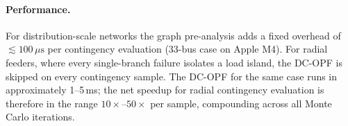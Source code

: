 \paragraph{Performance.}

For distribution-scale networks the graph pre-analysis adds a fixed overhead
of $\lesssim 100\,\mu\mathrm{s}$ per contingency evaluation (33-bus case on
Apple M4).  For radial feeders, where every single-branch failure isolates a
load island, the DC-OPF is skipped on every contingency sample.  The DC-OPF
for the same case runs in approximately 1--5\,ms; the net speedup for radial
contingency evaluation is therefore in the range $10\times$--$50\times$ per
sample, compounding across all Monte Carlo iterations.
